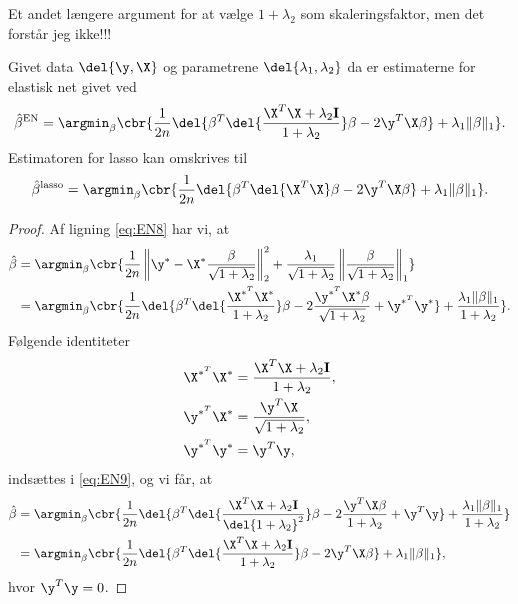 Et andet længere argument for at vælge \(1+\lambda_2\) som skaleringsfaktor, men det forstår jeg ikke!!!
%
\begin{thm} \label{thm:elastisk_net2}
Givet data \(\del{\y, \X}\) og parametrene \(\del{\lambda_1, \lambda_2}\) da er estimaterne for elastisk net givet ved
\begin{align}
\hat{\beta}^\text{EN} = \argmin_\beta \cbr{ \frac{1}{2n} \del{\beta^T \del{\frac{\X^T \X + \lambda_2 \mathbf{I}}{1 + \lambda_2}} \beta - 2 \y^T \X \beta} + \lambda_1 \Vert \beta \Vert_1}. \label{eq:EN6}
\end{align}
Estimatoren for lasso kan omskrives til
\begin{align}
\hat{\beta}^\text{lasso} = \argmin_\beta \cbr{ \frac{1}{2n} \del{ \beta^T \del{\X^T \X} \beta - 2 \y^T \X \beta } + \lambda_1 \Vert \beta \Vert_1}. \label{eq:EN7}
\end{align}
\end{thm}
\begin{proof}
Af ligning \eqref{eq:EN8} har vi, at
\begin{align}
\hat{\beta} &= \argmin_{\beta} \cbr{\frac{1}{2n} \left\Vert \y^* - \X^* \frac{\beta}{\sqrt{1+\lambda_2}} \right\Vert_2^2 + \frac{\lambda_1}{\sqrt{1+\lambda_2}} \left\Vert \frac{\beta}{\sqrt{1+\lambda_2}} \right\Vert_1} \nonumber \\
&=\argmin_{\beta} \cbr{\frac{1}{2n} \del{\beta^T \del{\frac{\X^{*^T} \X^*}{1+\lambda_2}} \beta - 2 \frac{\y^{*^T} \X^* \beta}{\sqrt{1+\lambda_2}} + \y^{*^T} \y^*} + \frac{\lambda_1 \Vert \beta \Vert_1}{1+\lambda_2}}. \label{eq:EN9}
\end{align}
Følgende identiteter
\begin{align*}
\X^{*^T} \X^* &= \frac{\X^T \X + \lambda_2 \mathbf{I}}{1+ \lambda_2}, \\
\y^{*^T} \X^* &= \frac{\y^T \X}{\sqrt{1+\lambda_2}} ,\\
\y^{*^T} \y^* &= \y^T \y, 
\end{align*}
indsættes i \eqref{eq:EN9}, og vi får, at
\begin{align*}
\hat{\beta} &= \argmin_{\beta} \cbr{\frac{1}{2n} \del{\beta^T \del{\frac{\X^T \X + \lambda_2 \mathbf{I}}{\del{1+\lambda_2}^2}} \beta - 2 \frac{\y^T \X \beta}{1+\lambda_2} + \y^T \y} + \frac{\lambda_1 \Vert \beta \Vert_1}{1+\lambda_2}} \\ 
&= \argmin_{\beta} \cbr{ \frac{1}{2n} \del{\beta^T \del{\frac{\X^T \X + \lambda_2 \mathbf{I}}{1+ \lambda_2}} \beta - 2 \y^T \X \beta} + \lambda_1 \Vert \beta \Vert_1},
\end{align*}
hvor \(\y^T \y= 0 \).
\end{proof}
